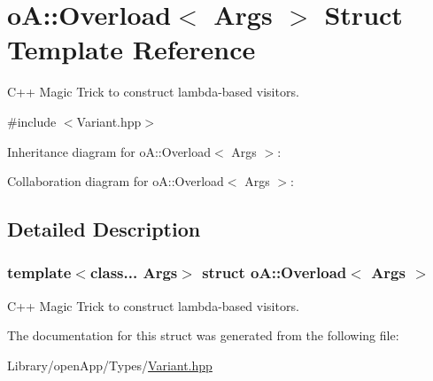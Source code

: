 \hypertarget{structo_a_1_1_overload}{}\section{oA\+:\+:Overload$<$ Args $>$ Struct Template Reference}
\label{structo_a_1_1_overload}


C++ Magic Trick to construct lambda-\/based visitors.  




{\ttfamily \#include $<$Variant.\+hpp$>$}



Inheritance diagram for oA\+:\+:Overload$<$ Args $>$\+:


Collaboration diagram for oA\+:\+:Overload$<$ Args $>$\+:


\subsection{Detailed Description}
\subsubsection*{template$<$class... Args$>$\newline
struct o\+A\+::\+Overload$<$ Args $>$}

C++ Magic Trick to construct lambda-\/based visitors. 

The documentation for this struct was generated from the following file\+:\begin{DoxyCompactItemize}
\item 
Library/open\+App/\+Types/\mbox{\hyperlink{_variant_8hpp}{Variant.\+hpp}}\end{DoxyCompactItemize}
